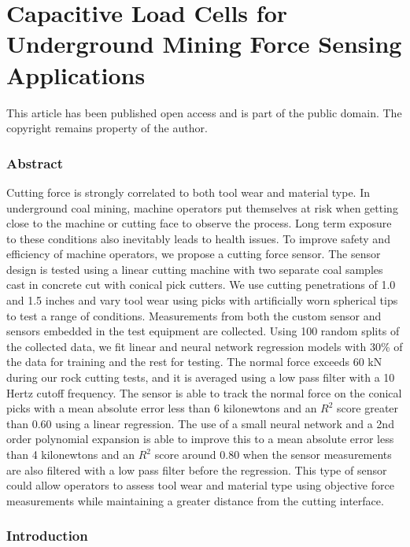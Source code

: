 \chapter{Capacitive Load Cells for Underground Mining Force Sensing Applications
\label{chap:P3}}

\begin{center}
This article has been published open access and is part of the public domain.
The copyright remains property of the author.
\end{center}

\subsection{Abstract}

Cutting force is strongly correlated to both tool wear and material type.
In underground coal mining, machine operators put themselves at risk when 
getting close to the machine or cutting face to observe the process.
Long term exposure to these conditions also inevitably leads to health issues.
To improve safety and efficiency of machine operators, 
we propose a cutting force sensor.
The sensor design is tested using a linear cutting machine with two separate coal samples
cast in concrete cut with conical pick cutters. 
We use cutting penetrations of 1.0 and 1.5 inches and vary tool wear using picks with artificially worn
spherical tips to test a range of conditions.
Measurements from both the custom sensor and sensors embedded in the test equipment are collected.
Using 100 random splits of the collected data, we fit linear and neural network regression models
with 30\% of the data for training and the rest for testing. 
The normal force exceeds 60 kN during our rock cutting tests,
and it is averaged using a low pass filter with a 10 Hertz cutoff frequency.
The sensor is able to track the normal force on the conical picks with a 
mean absolute error less than 6 kilonewtons and an $R^2$ score greater than 0.60 using a linear regression.
The use of a small neural network and a 2nd order polynomial expansion is able to 
improve this to a mean absolute error less than 4 kilonewtons and an $R^2$ score around 0.80 when the 
sensor measurements are also filtered with a low pass filter before the regression.
This type of sensor could allow operators to assess tool wear and material type
using objective force measurements while maintaining a greater distance from the cutting interface.

\subsection{Introduction}\label{sec1}

